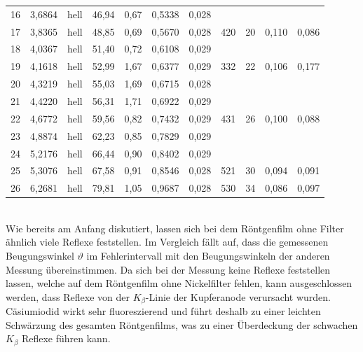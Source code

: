 \documentclass[a4paper,twoside,final]{article}
\begin{document}
\begin{table}[ht]
\begin{tabular}{l c c c c c | c c c c c }
    16 & 3,6864 & hell         & 46,94 & 0,67 & 0,5338 & 0,028 &     &    &       &       \\
    17 & 3,8365 & hell         & 48,85 & 0,69 & 0,5670 & 0,028 & 420 & 20 & 0,110 & 0,086 \\
    18 & 4,0367 & hell         & 51,40 & 0,72 & 0,6108 & 0,029 &     &    &       &       \\
    19 & 4,1618 & hell         & 52,99 & 1,67 & 0,6377 & 0,029 & 332 & 22 & 0,106 & 0,177 \\
    20 & 4,3219 & hell         & 55,03 & 1,69 & 0,6715 & 0,028 &     &    &       &       \\
    21 & 4,4220 & hell         & 56,31 & 1,71 & 0,6922 & 0,029 &     &    &       &       \\
    22 & 4,6772 & hell         & 59,56 & 0,82 & 0,7432 & 0,029 & 431 & 26 & 0,100 & 0,088 \\
    23 & 4,8874 & hell         & 62,23 & 0,85 & 0,7829 & 0,029 &     &    &       &       \\
    24 & 5,2176 & hell         & 66,44 & 0,90 & 0,8402 & 0,029 &     &    &       &       \\
    25 & 5,3076 & hell         & 67,58 & 0,91 & 0,8546 & 0,028 & 521 & 30 & 0,094 & 0,091 \\
    26 & 6,2681 & hell         & 79,81 & 1,05 & 0,9687 & 0,028 & 530 & 34 & 0,086 & 0,097
	\end{tabular}
\end{table}\\
Wie bereits am Anfang diskutiert, lassen sich bei dem Röntgenfilm ohne Filter ähnlich viele Reflexe feststellen. Im Vergleich fällt auf, dass die gemessenen Beugungswinkel $\vartheta$ im Fehlerintervall mit den Beugungswinkeln der anderen Messung übereinstimmen. Da sich bei der Messung keine Reflexe feststellen lassen, welche auf dem Röntgenfilm ohne Nickelfilter fehlen, kann ausgeschlossen werden, dass Reflexe von der $K_\beta$-Linie der Kupferanode verursacht wurden.\\
Cäsiumiodid wirkt sehr fluoreszierend und führt deshalb zu einer leichten Schwärzung des gesamten Röntgenfilms, was zu einer Überdeckung der schwachen $K_\beta$ Reflexe führen kann.
\FloatBarrier
\end{document}
